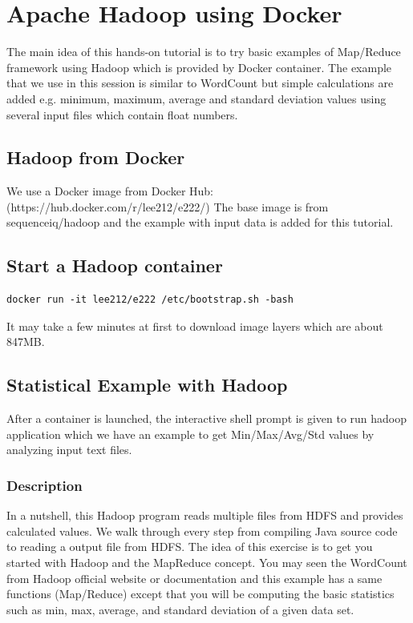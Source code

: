 \section{Apache Hadoop using Docker}
\label{apache-hadoop-with-docker}

The main idea of this hands-on tutorial is to try basic examples of
Map/Reduce framework using Hadoop which is provided by Docker
container. The example that we use in this session is similar to
WordCount but simple calculations are added e.g. minimum, maximum,
average and standard deviation values using several input files which
contain float numbers.

\subsection{Hadoop from Docker}
\label{ahwd-hadoop-docker}

We use a Docker image from Docker Hub:
(https://hub.docker.com/r/lee212/e222/) The base image is from
sequenceiq/hadoop and the example with input data is added for this
tutorial.

\subsection{Start a Hadoop container}
\label{ahwd-start}

\begin{lstlisting}
docker run -it lee212/e222 /etc/bootstrap.sh -bash
\end{lstlisting}

It may take a few minutes at first to download image layers which are
about 847MB.

\subsection{Statistical Example with Hadoop}       

After a container is launched, the interactive shell prompt is given
to run hadoop application which we have an example to get
Min/Max/Avg/Std values by analyzing input text files.

\subsubsection{Description}

In a nutshell, this Hadoop program reads multiple files from HDFS and
provides calculated values. We walk through every step from compiling
Java source code to reading a output file from HDFS. The idea of this
exercise is to get you started with Hadoop and the MapReduce
concept. You may seen the WordCount from Hadoop official website or
documentation and this example has a same functions (Map/Reduce)
except that you will be computing the basic statistics such as min,
max, average, and standard deviation of a given data set.

